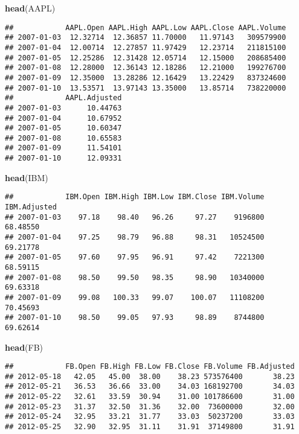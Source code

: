 \documentclass[]{article}
\newenvironment{Shaded}{\begin{snugshade}}{\end{snugshade}}
\newcommand{\KeywordTok}[1]{\textcolor[rgb]{0.13,0.29,0.53}{\textbf{#1}}}
\newcommand{\NormalTok}[1]{#1}
\begin{document}
\begin{Shaded}
\begin{Highlighting}[]
\KeywordTok{head}\NormalTok{(AAPL)}
\end{Highlighting}
\end{Shaded}

\begin{verbatim}
##            AAPL.Open AAPL.High AAPL.Low AAPL.Close AAPL.Volume
## 2007-01-03  12.32714  12.36857 11.70000   11.97143   309579900
## 2007-01-04  12.00714  12.27857 11.97429   12.23714   211815100
## 2007-01-05  12.25286  12.31428 12.05714   12.15000   208685400
## 2007-01-08  12.28000  12.36143 12.18286   12.21000   199276700
## 2007-01-09  12.35000  13.28286 12.16429   13.22429   837324600
## 2007-01-10  13.53571  13.97143 13.35000   13.85714   738220000
##            AAPL.Adjusted
## 2007-01-03      10.44763
## 2007-01-04      10.67952
## 2007-01-05      10.60347
## 2007-01-08      10.65583
## 2007-01-09      11.54101
## 2007-01-10      12.09331
\end{verbatim}

\begin{Shaded}
\begin{Highlighting}[]
\KeywordTok{head}\NormalTok{(IBM)}
\end{Highlighting}
\end{Shaded}

\begin{verbatim}
##            IBM.Open IBM.High IBM.Low IBM.Close IBM.Volume IBM.Adjusted
## 2007-01-03    97.18    98.40   96.26     97.27    9196800     68.48550
## 2007-01-04    97.25    98.79   96.88     98.31   10524500     69.21778
## 2007-01-05    97.60    97.95   96.91     97.42    7221300     68.59115
## 2007-01-08    98.50    99.50   98.35     98.90   10340000     69.63318
## 2007-01-09    99.08   100.33   99.07    100.07   11108200     70.45693
## 2007-01-10    98.50    99.05   97.93     98.89    8744800     69.62614
\end{verbatim}

\begin{Shaded}
\begin{Highlighting}[]
\KeywordTok{head}\NormalTok{(FB)}
\end{Highlighting}
\end{Shaded}

\begin{verbatim}
##            FB.Open FB.High FB.Low FB.Close FB.Volume FB.Adjusted
## 2012-05-18   42.05   45.00  38.00    38.23 573576400       38.23
## 2012-05-21   36.53   36.66  33.00    34.03 168192700       34.03
## 2012-05-22   32.61   33.59  30.94    31.00 101786600       31.00
## 2012-05-23   31.37   32.50  31.36    32.00  73600000       32.00
## 2012-05-24   32.95   33.21  31.77    33.03  50237200       33.03
## 2012-05-25   32.90   32.95  31.11    31.91  37149800       31.91
\end{verbatim}
\end{document}
